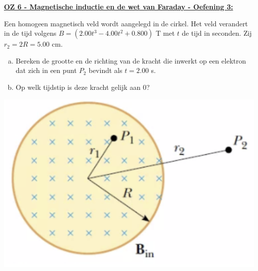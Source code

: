 \textbf{\underline{OZ 6 - Magnetische inductie en de wet van Faraday - Oefening 3:}}
\vspace{0.5cm}

    \begin{minipage}{.76\textwidth}
        Een homogeen magnetisch veld wordt aangelegd in de cirkel. Het veld verandert in de tijd volgens $B = (2.00t^3 - 4.00t^2 +0.800) $ T met $t$ de tijd in seconden. Zij $r_2 = 2R = 5.00$ cm.

        \begin{enumerate}[(a)]
            \item Bereken de grootte en de richting van de kracht die inwerkt op een elektron dat zich in een punt $P_2$ bevindt als $t = 2.00$ s.
            \item Op welk tijdstip is deze kracht gelijk aan $0$?
        \end{enumerate}    
    \end{minipage}
    \hspace{0.5cm}\begin{minipage}{.2\textwidth}
        \includegraphics[scale = 0.25]{oz06/resources/Oz6Oef3.png}
    \end{minipage}

